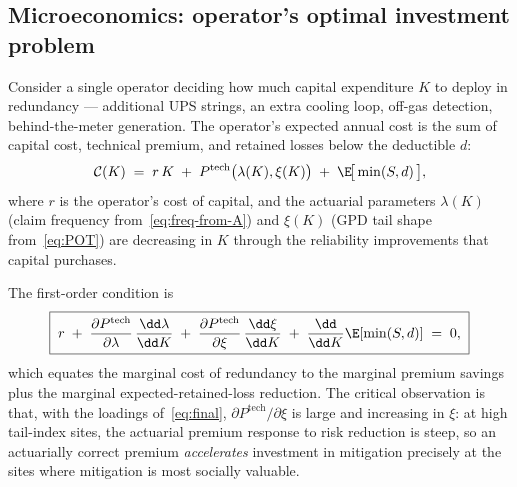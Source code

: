 \subsection{Microeconomics: operator's optimal investment problem}\label{ss:micro}

Consider a single operator deciding how much capital expenditure $K$
to deploy in redundancy --- additional UPS strings, an extra cooling
loop, off-gas detection, behind-the-meter generation. The operator's
expected annual cost is the sum of capital cost, technical premium,
and retained losses below the deductible $d$:
\begin{equation}\label{eq:opercost}
   \mathcal{C}(K) \;=\; r\,K \;+\; P^{\mathrm{tech}}\bigl(\lambda(K),\xi(K)\bigr)
   \;+\; \E\!\bigl[\,\min(S,d)\,\bigr],
\end{equation}
where $r$ is the operator's cost of capital, and the actuarial
parameters $\lambda(K)$ (claim frequency from~\eqref{eq:freq-from-A})
and $\xi(K)$ (GPD tail shape from~\eqref{eq:POT}) are decreasing in
$K$ through the reliability improvements that capital purchases.

The first-order condition is
\begin{equation}\label{eq:foc}
   \boxed{\;
   r \;+\; \frac{\partial P^{\mathrm{tech}}}{\partial\lambda}\,
   \frac{\dd\lambda}{\dd K}
   \;+\; \frac{\partial P^{\mathrm{tech}}}{\partial\xi}\,
   \frac{\dd\xi}{\dd K}
   \;+\; \frac{\dd}{\dd K}\E[\min(S,d)] \;=\; 0,\;}
\end{equation}
which equates the marginal cost of redundancy to the marginal premium
savings plus the marginal expected-retained-loss reduction. The
critical observation is that, with the loadings of~\eqref{eq:final},
$\partial P^{\mathrm{tech}}/\partial\xi$ is large and increasing in
$\xi$: at high tail-index sites, the actuarial premium response to
risk reduction is steep, so an actuarially correct premium
\emph{accelerates} investment in mitigation precisely at the sites
where mitigation is most socially valuable.

